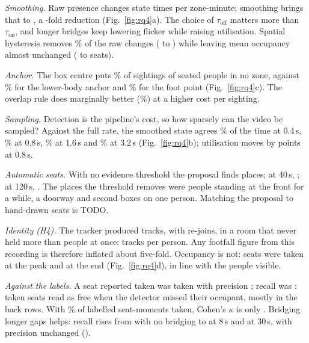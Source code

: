 \emph{Smoothing.} Raw presence changes state  times per
zone-minute; smoothing brings that to , a
-fold reduction (Fig.~\ref{fig:rq4}a). The choice of
$\tau_{\mathrm{off}}$ matters more than $\tau_{\mathrm{on}}$, and longer bridges
keep lowering flicker while raising utilisation. Spatial hysteresis removes
\% of the raw changes ( to
) while leaving mean occupancy almost unchanged
( to  seats).

\emph{Anchor.} The box centre puts \% of sightings of
seated people in no zone, against \% for the lower-body
anchor and \% for the foot point (Fig.~\ref{fig:rq4}c).
The overlap rule does marginally better (\%) at a
higher cost per sighting.

\emph{Sampling.} Detection is the pipeline's cost, so how sparsely can the video
be sampled? Against the full rate, the smoothed state agrees
\% of the time at 0.4\,s, \% at 0.8\,s,
\% at 1.6\,s and \% at 3.2\,s
(Fig.~\ref{fig:rq4}b); utilisation moves by  points at
0.8\,s.

\emph{Automatic seats.} With no evidence threshold the proposal finds
 places; at 40\,s, ; at 120\,s,
. The places the threshold removes were people standing at
the front for a while, a doorway and second boxes on one person. Matching the
proposal to hand-drawn seats is TODO.

\emph{Identity (H4).} The tracker produced  tracks, with
 re-joins, in a room that never held more than
 people at once:  tracks
per person. Any footfall figure from this recording is therefore inflated about
five-fold. Occupancy is not:  seats were taken at
the peak and  at the end (Fig.~\ref{fig:rq4}d), in line
with the people visible.

\emph{Against the labels.} A seat reported taken was taken with precision
; recall was : taken seats read as free
when the detector missed their occupant, mostly in the back rows. With
\% of labelled seat-moments taken, Cohen's $\kappa$ is only
. Bridging longer gaps helps: recall rises from
 with no bridging to  at 8\,s and
 at 30\,s, with precision unchanged
().

